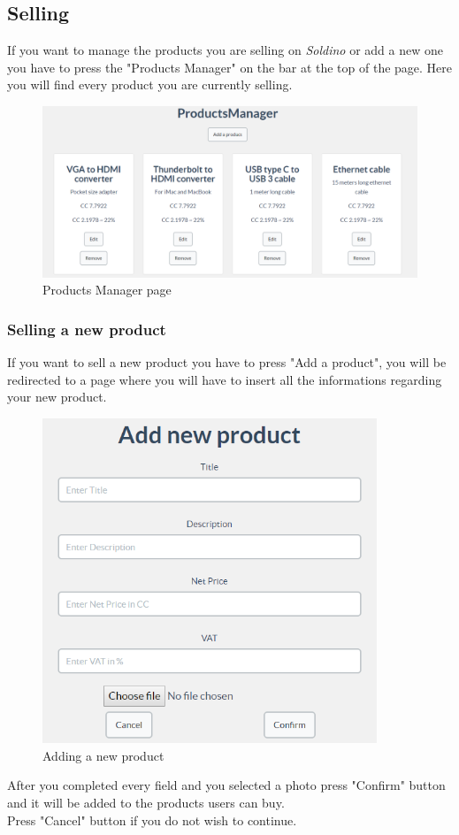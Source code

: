 	\subsection{Selling}
	If you want to manage the products you are selling on \textit{Soldino} 
	or add a new one you have to press the "Products Manager" on the bar at the 
	top of the page. Here you will find every product you are currently selling.
	\begin{figure}[H]
		\includegraphics[width=15cm]{res/images/products_manager.png}
		\centering
		\caption{Products Manager page}
	\end{figure}
		\subsubsection{Selling a new product}
		If you want to sell a new product you have to press "Add a product", you 
		will be redirected to a page where you will have to insert all the 
		informations regarding your new product.
		\begin{figure}[H]
			\includegraphics[width=10cm]{res/images/add_new_product.png}
			\centering
			\caption{Adding a new product}
		\end{figure}
		\noindent After you completed every field and you selected a photo 
		press "Confirm" button and it will be added to the products users can buy.
		\\Press "Cancel" button if you do not wish to continue.
